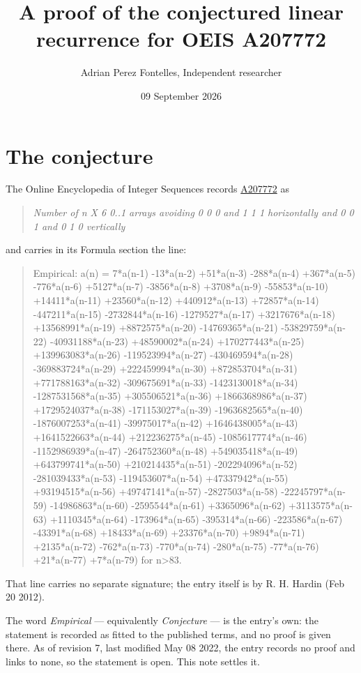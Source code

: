 \documentclass[11pt]{article}
\title{A proof of the conjectured linear recurrence for OEIS A207772}
\author{Adrian Perez Fontelles, Independent researcher}
\date{09 September 2026}
\theoremstyle{definition}
\begin{document}
\maketitle
\section{The conjecture}

The Online Encyclopedia of Integer Sequences records \href{https://oeis.org/A207772}{A207772} as

\begin{quote}\itshape Number of n X 6 0..1 arrays avoiding 0 0 0 and 1 1 1 horizontally and 0 0 1 and 0 1 0 vertically\end{quote}

and carries in its Formula section the line:

\begin{quote}\ttfamily Empirical: a(n) = 7*a(n-1) -13*a(n-2) +51*a(n-3) -288*a(n-4) +367*a(n-5) -776*a(n-6) +5127*a(n-7) -3856*a(n-8) +3708*a(n-9) -55853*a(n-10) +14411*a(n-11) +23560*a(n-12) +440912*a(n-13) +72857*a(n-14) -447211*a(n-15) -2732844*a(n-16) -1279527*a(n-17) +3217676*a(n-18) +13568991*a(n-19) +8872575*a(n-20) -14769365*a(n-21) -53829759*a(n-22) -40931188*a(n-23) +48590002*a(n-24) +170277443*a(n-25) +139963083*a(n-26) -119523994*a(n-27) -430469594*a(n-28) -369883724*a(n-29) +222459994*a(n-30) +872853704*a(n-31) +771788163*a(n-32) -309675691*a(n-33) -1423130018*a(n-34) -1287531568*a(n-35) +305506521*a(n-36) +1866368986*a(n-37) +1729524037*a(n-38) -171153027*a(n-39) -1963682565*a(n-40) -1876007253*a(n-41) -39975017*a(n-42) +1646438005*a(n-43) +1641522663*a(n-44) +212236275*a(n-45) -1085617774*a(n-46) -1152986939*a(n-47) -264752360*a(n-48) +549035418*a(n-49) +643799741*a(n-50) +210214435*a(n-51) -202294096*a(n-52) -281039433*a(n-53) -119453607*a(n-54) +47337942*a(n-55) +93194515*a(n-56) +49747141*a(n-57) -2827503*a(n-58) -22245797*a(n-59) -14986863*a(n-60) -2595544*a(n-61) +3365096*a(n-62) +3113575*a(n-63) +1110345*a(n-64) -173964*a(n-65) -395314*a(n-66) -223586*a(n-67) -43391*a(n-68) +18433*a(n-69) +23376*a(n-70) +9894*a(n-71) +2135*a(n-72) -762*a(n-73) -770*a(n-74) -280*a(n-75) -77*a(n-76) +21*a(n-77) +7*a(n-79) for n>83.\end{quote}

That line carries no separate signature; the entry itself is by R. H. Hardin (Feb 20 2012).

The word {\itshape Empirical} --- equivalently {\itshape Conjecture} --- is the entry's own: the statement is recorded as fitted to the published terms, and no proof is given there. As of revision 7, last modified May 08 2022, the entry records no proof and links to none, so the statement is open. This note settles it.
\end{document}
